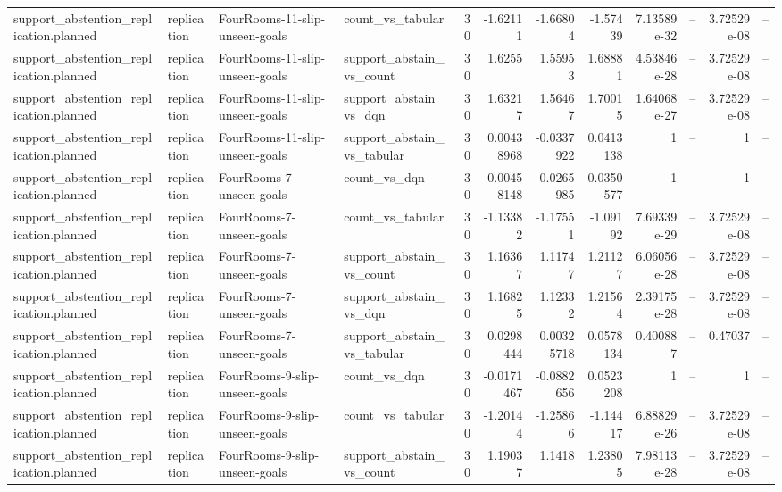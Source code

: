 \begin{longtable}{llllrrrrrrrr}
support\_abstention\_replication.planned & replication & FourRooms-11-slip-unseen-goals & count\_vs\_tabular & 30 & -1.62111 & -1.66804 & -1.57439 & 7.13589e-32 & -- & 3.72529e-08 & -- \\
support\_abstention\_replication.planned & replication & FourRooms-11-slip-unseen-goals & support\_abstain\_vs\_count & 30 & 1.6255 & 1.55953 & 1.68881 & 4.53846e-28 & -- & 3.72529e-08 & -- \\
support\_abstention\_replication.planned & replication & FourRooms-11-slip-unseen-goals & support\_abstain\_vs\_dqn & 30 & 1.63217 & 1.56467 & 1.70015 & 1.64068e-27 & -- & 3.72529e-08 & -- \\
support\_abstention\_replication.planned & replication & FourRooms-11-slip-unseen-goals & support\_abstain\_vs\_tabular & 30 & 0.00438968 & -0.0337922 & 0.0413138 & 1 & -- & 1 & -- \\
support\_abstention\_replication.planned & replication & FourRooms-7-unseen-goals & count\_vs\_dqn & 30 & 0.00458148 & -0.0265985 & 0.0350577 & 1 & -- & 1 & -- \\
support\_abstention\_replication.planned & replication & FourRooms-7-unseen-goals & count\_vs\_tabular & 30 & -1.13382 & -1.17551 & -1.09192 & 7.69339e-29 & -- & 3.72529e-08 & -- \\
support\_abstention\_replication.planned & replication & FourRooms-7-unseen-goals & support\_abstain\_vs\_count & 30 & 1.16367 & 1.11747 & 1.21127 & 6.06056e-28 & -- & 3.72529e-08 & -- \\
support\_abstention\_replication.planned & replication & FourRooms-7-unseen-goals & support\_abstain\_vs\_dqn & 30 & 1.16825 & 1.12332 & 1.21564 & 2.39175e-28 & -- & 3.72529e-08 & -- \\
support\_abstention\_replication.planned & replication & FourRooms-7-unseen-goals & support\_abstain\_vs\_tabular & 30 & 0.0298444 & 0.00325718 & 0.0578134 & 0.400887 & -- & 0.47037 & -- \\
support\_abstention\_replication.planned & replication & FourRooms-9-slip-unseen-goals & count\_vs\_dqn & 30 & -0.0171467 & -0.0882656 & 0.0523208 & 1 & -- & 1 & -- \\
support\_abstention\_replication.planned & replication & FourRooms-9-slip-unseen-goals & count\_vs\_tabular & 30 & -1.20144 & -1.25866 & -1.14417 & 6.88829e-26 & -- & 3.72529e-08 & -- \\
support\_abstention\_replication.planned & replication & FourRooms-9-slip-unseen-goals & support\_abstain\_vs\_count & 30 & 1.19037 & 1.1418 & 1.23805 & 7.98113e-28 & -- & 3.72529e-08 & -- \\

\end{longtable}
